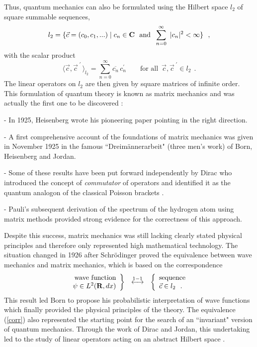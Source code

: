 \documentclass[12pt]{report}
\begin{document}
Thus, quantum mechanics can also  be formulated 
using the Hilbert space $l_2$ 
of square summable sequences,  
$$
l_2 = \{ \vec{c} = (c_0, c_1, ...) \mid c_n \in {\bf C}
\ \ {\rm and} \ \; \sum_{n=0}^{\infty} \ | c_n | ^2 < \infty \}
\ \ ,
$$
with the scalar product 
$$
\langle \vec c , \vec c ^{\; \prime} \, \rangle _{l_2} 
= \sum_{n=0} ^{\infty}
\overline{c_n} \, c^{\prime} _n
\qquad \mbox{for all} \ \; 
\vec{c}, \vec c ^{\; \prime} \in l_2 
\ \ .
$$
The linear operators on $l_2$ are then given 
by square matrices of infinite order.
This formulation of quantum theory is known as matrix mechanics
and was actually the first one to be discovered 
\cite{pais, kragh, moore}:

- In 1925, Heisenberg wrote his pioneering paper pointing 
in the right direction. 

- A first comprehensive account
of the foundations of matrix mechanics 
was given in November 1925 in the famous ``Dreim\"annerarbeit"
(three men's work) of Born, Heisenberg and Jordan. 

- Some of these results have been put forward    
independently by Dirac 
who introduced the 
concept of 
{\em commutator} of operators 
and identified it as the quantum analogon 
of the classical Poisson brackets \cite{wig}. 
 
- Pauli's subsequent derivation of the 
spectrum of the hydrogen atom using matrix methods  
provided strong evidence for the correctness of this approach.  

Despite this success, matrix mechanics
was still lacking clearly stated physical 
principles and therefore only represented high
mathematical technology. 
The situation changed in 1926 after Schr\"odinger
proved the equivalence between wave mechanics and 
matrix mechanics, which is 
based on the correspondence
\begin{equation}
\label{corr}
\left.
\begin{array}{r}
\mbox{wave function}
\\
 \psi \in \lt 
\end{array}
\right\}
 \ \ \stackrel{{\rm 1-1}}{\longleftrightarrow}
\ \ 
\left\{
\begin{array}{l}
\mbox{sequence}
\\
\vec c \in l_2  
\ \ .
\end{array}
\right.
\end{equation}
This result 
led Born to propose his probabilistic interpretation 
of wave functions 
which finally provided the physical principles 
of the theory. 
The equivalence (\ref{corr}) also 
represented the starting point for the search of an ``invariant"
version of quantum mechanics. Through the work of Dirac and Jordan,
this undertaking led to the study of linear operators acting on
an abstract Hilbert space \cite{fh}\cite{jvn,stone}.
\end{document}
